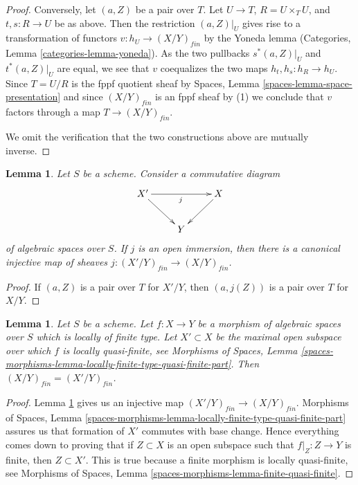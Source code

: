 \documentclass{stacks-project}
\theoremstyle{plain}
\newtheorem{lemma}[subsection]{Lemma}
\theoremstyle{definition}
\theoremstyle{remark}
\numberwithin{equation}{subsection}
\begin{document}
\begin{proof}
\medskip\noindent
Conversely, let $(a, Z)$ be a pair over $T$.
Let $U \to T$, $R = U \times_T U$, and $t, s : R \to U$ be as
above. Then the restriction $(a, Z)|_U$ gives rise to a
transformation of functors $v : h_U \to (X/Y)_{fin}$ by the
Yoneda lemma
(Categories, Lemma \ref{categories-lemma-yoneda}).
As the two pullbacks $s^*(a, Z)|_U$ and $t^*(a, Z)|_U$
are equal, we see that $v$ coequalizes the two maps
$h_t, h_s : h_R \to h_U$. Since $T = U/R$ is the fppf quotient sheaf by
Spaces, Lemma \ref{spaces-lemma-space-presentation}
and since $(X/Y)_{fin}$ is an fppf sheaf by (1) we conclude
that $v$ factors through a map $T \to (X/Y)_{fin}$.

\medskip\noindent
We omit the verification that the two constructions above are mutually
inverse.
\end{proof}

\begin{lemma}
\label{lemma-finite-open}
Let $S$ be a scheme. Consider a commutative diagram
$$
\xymatrix{
X' \ar[rr]_j \ar[rd] & & X \ar[ld] \\
& Y
}
$$
of algebraic spaces over $S$. If $j$ is an open immersion, then
there is a canonical injective map of sheaves
$j : (X'/Y)_{fin} \to (X/Y)_{fin}$.
\end{lemma}

\begin{proof}
If $(a, Z)$ is a pair over $T$ for $X'/Y$, then
$(a, j(Z))$ is a pair over $T$ for $X/Y$.
\end{proof}

\begin{lemma}
\label{lemma-finite-lives-on-locally-quasi-finite-part}
Let $S$ be a scheme.
Let $f : X \to Y$ be a morphism of algebraic spaces over $S$ which is
locally of finite type.
Let $X' \subset X$ be the maximal open subspace over which $f$ is
locally quasi-finite, see
Morphisms of Spaces,
Lemma \ref{spaces-morphisms-lemma-locally-finite-type-quasi-finite-part}.
Then $(X/Y)_{fin} = (X'/Y)_{fin}$.
\end{lemma}

\begin{proof}
Lemma \ref{lemma-finite-open}
gives us an injective map $(X'/Y)_{fin} \to (X/Y)_{fin}$.
Morphisms of Spaces,
Lemma \ref{spaces-morphisms-lemma-locally-finite-type-quasi-finite-part}
assures us that formation of $X'$ commutes with base change.
Hence everything comes down to proving that if
$Z \subset X$ is an open subspace such that $f|_Z : Z \to Y$ is finite,
then $Z \subset X'$. This is true because a finite morphism
is locally quasi-finite, see
Morphisms of Spaces, Lemma \ref{spaces-morphisms-lemma-finite-quasi-finite}.
\end{proof}
\end{document}
